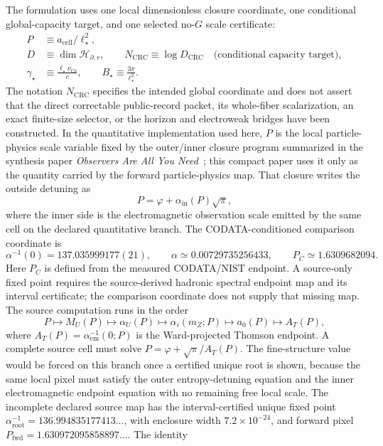 \documentclass[11pt]{article}
\begin{document}
The formulation uses one local dimensionless closure coordinate, one conditional global-capacity
target, and one selected no-\(G\) scale certificate:
\begin{align}
P &\equiv a_{\mathrm{cell}}/\ell_\star^2,\\
D &\equiv \dim\mathcal H_{\partial,r},
\qquad N_{\mathrm{CRC}}\equiv\log D_{\mathrm{CRC}}\quad\text{(conditional capacity target)},\\
\gamma_\star&\equiv \frac{\ell_\star\nu_{\mathrm{Cs}}}{c},
\qquad
B_\star\equiv \frac{3\pi}{\ell_\star^2}.
\end{align}
The notation \(N_{\mathrm{CRC}}\) specifies the intended global coordinate and does not assert that
the direct correctable public-record packet, its whole-fiber scalarization, an exact
finite-size selector, or the horizon and electroweak bridges have been constructed.
In the quantitative implementation used here, \(P\) is the local particle-physics scale variable
fixed by the outer/inner closure program summarized in the synthesis paper
\emph{Observers Are All You Need}~\cite{ophsynthesis}; this compact paper uses it only as the
quantity carried by the forward particle-physics map. That closure writes the outside
detuning as
\[
P=\varphi+\alpha_{\mathrm{in}}(P)\sqrt{\pi},
\]
where the inner side is the electromagnetic observation scale emitted by the same cell on the
declared quantitative branch. The CODATA-conditioned comparison coordinate is
\[
\alpha^{-1}(0)=137.035999177(21),\qquad
\alpha\simeq0.00729735256433,\qquad
P_C\simeq1.6309682094.
\]
Here \(P_C\) is defined from the measured CODATA/NIST endpoint. A source-only fixed point requires
the source-derived hadronic spectral endpoint map and its interval certificate; the comparison coordinate does not supply
that missing map.
The source computation runs in the order
\[
P\mapsto M_U(P)\mapsto\alpha_U(P)\mapsto\alpha_i(m_Z;P)\mapsto
a_0(P)\mapsto A_T(P),
\]
where \(A_T(P)=\alpha_{\mathrm{em}}^{-1}(0;P)\) is the Ward-projected Thomson
endpoint. A complete source cell must solve
\(P=\varphi+\sqrt{\pi}/A_T(P)\).
The fine-structure value would be forced on this branch once a certified
unique root is shown, because the same local pixel
must satisfy the outer entropy-detuning equation and the inner electromagnetic
endpoint equation with no remaining free local scale.
The incomplete declared source map has the interval-certified unique fixed
point \(\alpha_{\mathrm{root}}^{-1}=136.994835177413\ldots\), with enclosure
width \(7.2\times10^{-24}\), and forward pixel
\(P_{\mathrm{fwd}}=1.630972095858897\ldots\). The identity
\end{document}

